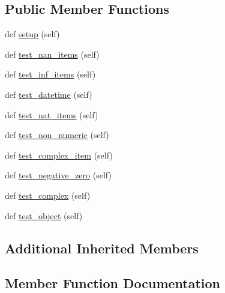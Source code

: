 \subsection*{Public Member Functions}
\begin{DoxyCompactItemize}
\item 
def \hyperlink{classnumpy_1_1testing_1_1tests_1_1test__utils_1_1TestEqual_a49f0292c0a728d104a1d947897a9c2e9}{setup} (self)
\item 
def \hyperlink{classnumpy_1_1testing_1_1tests_1_1test__utils_1_1TestEqual_a1f5e46a2cef382073e670b418f987946}{test\+\_\+nan\+\_\+items} (self)
\item 
def \hyperlink{classnumpy_1_1testing_1_1tests_1_1test__utils_1_1TestEqual_a09370e423f22f2431207922a6141fa28}{test\+\_\+inf\+\_\+items} (self)
\item 
def \hyperlink{classnumpy_1_1testing_1_1tests_1_1test__utils_1_1TestEqual_ad6ee0841e407968e233b500961db6662}{test\+\_\+datetime} (self)
\item 
def \hyperlink{classnumpy_1_1testing_1_1tests_1_1test__utils_1_1TestEqual_a3cebbe1aa50b9c41f194118af6993960}{test\+\_\+nat\+\_\+items} (self)
\item 
def \hyperlink{classnumpy_1_1testing_1_1tests_1_1test__utils_1_1TestEqual_a2b400fad500596233cc689ae18f29dc6}{test\+\_\+non\+\_\+numeric} (self)
\item 
def \hyperlink{classnumpy_1_1testing_1_1tests_1_1test__utils_1_1TestEqual_adc1e611fd21754c157ffa9125ace0834}{test\+\_\+complex\+\_\+item} (self)
\item 
def \hyperlink{classnumpy_1_1testing_1_1tests_1_1test__utils_1_1TestEqual_acfc863d78d6d59f5dd2f5570e3a967de}{test\+\_\+negative\+\_\+zero} (self)
\item 
def \hyperlink{classnumpy_1_1testing_1_1tests_1_1test__utils_1_1TestEqual_a5b0d00ed66fe00624660588e4de75af4}{test\+\_\+complex} (self)
\item 
def \hyperlink{classnumpy_1_1testing_1_1tests_1_1test__utils_1_1TestEqual_aa3b1f073944773eef1321960b40b7129}{test\+\_\+object} (self)
\end{DoxyCompactItemize}
\subsection*{Additional Inherited Members}


\subsection{Member Function Documentation}
\mbox{\label{classnumpy_1_1testing_1_1tests_1_1test__utils_1_1TestEqual_a49f0292c0a728d104a1d947897a9c2e9}} 
